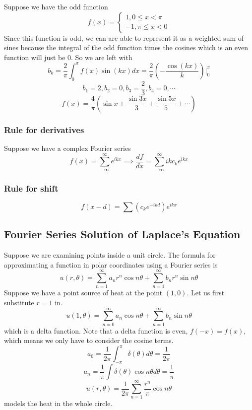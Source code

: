 \documentclass[12pt]{scrartcl}
\begin{document}
\begin{example}
    Suppose we have the odd function
    \begin{equation} f(x) =
        \begin{cases}
            1, 0 \leq x < \pi \\
            -1, \pi \leq x < 0
        \end{cases}
    \end{equation}
    Since this function is odd, we can are able to represent it as a weighted sum of sines because the integral of the odd function times the cosines which is an even function will just be 0. So we are left with
    \[b_k = \frac{2}{\pi}\int_0^\pi f(x) \sin(kx) dx = \frac{2}{\pi}(-\frac{\cos(kx)}{k})|_0^\pi\]
    \[b_1 = 2, b_2 = 0, b_3 = \frac{2}{3}, b_4 = 0, \cdots\]
    \[f(x) = \frac{4}{\pi}(\sin x + \frac{\sin 3x}{3} + \frac{\sin 5x}{5}+ \cdots)\]

\end{example}

\subsubsection{Rule for derivatives}
Suppose we have a complex Fourier series
\[f(x) = \sum_{-\infty}^\infty e^{ikx} \implies \frac{df}{dx} = \sum_{-\infty}^\infty ikc_ke^{ikx}\]

\subsubsection{Rule for shift}
\[f(x-d) = \sum (c_ke^{-ikd})e^{ikx}\]

\subsection{Fourier Series Solution of Laplace's Equation}

\begin{example}
    Suppose we are examining points inside a unit circle. The formula for approximating a function in polar coordinates using a Fourier series is
    \[u(r, \theta) = \sum_{n=1}^\infty a_n r^n \cos n\theta + \sum_{n=1}^\infty b_nr^n\sin n \theta\]
    Suppose we have a point source of heat at the point $(1,0)$. Let us first
    substitute $r = 1$ in.
    \[u(1, \theta) = \sum_{n=0}^\infty a_n \cos n \theta + \sum_{n=1}^\infty b_n \sin n \theta\] which is a delta function. Note that a delta function is even, $f(-x) = f(x)$,
    which means we only have to consider the cosine terms.
    \[a_0 = \frac{1}{2\pi}\int_{-\pi}^\pi \delta(\theta) d \theta = \frac{1}{2\pi}\]
    \[a_n = \frac{1}{\pi}\int \delta(\theta) \cos n \theta d \theta = \frac{1}{\pi}\]
    \[u(r,\theta) = \frac{1}{2\pi}\sum_{n=1}^\infty \frac{r^n}{\pi}\cos n \theta\] models the heat in the whole circle.

\end{example}
\end{document}
